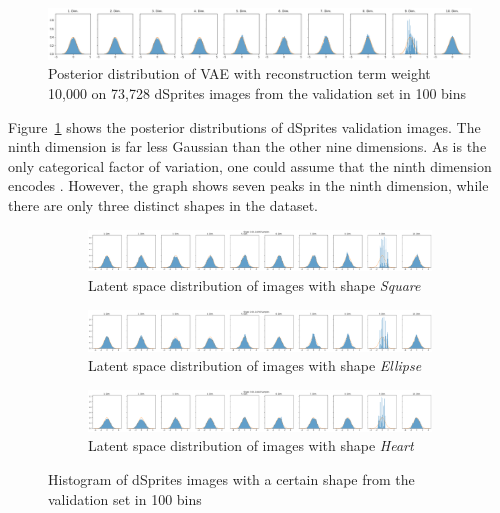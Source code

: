 \begin{figure}
    \centering
    \includegraphics[width=\textwidth]{images/latent_space_entanglement/vae_dsprites_lf_10000_dist.png}
    \caption[VAE Latent Space Distribution - dSprites]{Posterior distribution of \ac{VAE} with reconstruction term weight 10,000 on 73,728 dSprites images from the validation set in 100 bins}
    \label{fig:10000_vae_latent_space_distribution}
\end{figure}

Figure~\ref{fig:10000_vae_latent_space_distribution} shows the posterior distributions of dSprites validation images.
The ninth dimension is far less Gaussian than the other nine dimensions.
As  is the only categorical factor of variation, one could assume that the ninth dimension encodes .
However, the graph shows seven peaks in the ninth dimension, while there are only three distinct shapes in the dataset.

\begin{figure}
    \centering
    \begin{subfigure}{\textwidth}
        \centering
        \includegraphics[width=\textwidth]{images/latent_space_entanglement/vae_dsprites_lf_10000_dist_shape_1.png}
        \caption{Latent space distribution of images with shape \textit{Square}}
    \end{subfigure}
    \begin{subfigure}{\textwidth}
        \centering
        \includegraphics[width=\textwidth]{images/latent_space_entanglement/vae_dsprites_lf_10000_dist_shape_2.png}
        \caption{Latent space distribution of images with shape \textit{Ellipse}}
    \end{subfigure}
    \begin{subfigure}{\textwidth}
        \centering
        \includegraphics[width=\textwidth]{images/latent_space_entanglement/vae_dsprites_lf_10000_dist_shape_3.png}
        \caption{Latent space distribution of images with shape \textit{Heart}}
    \end{subfigure}
    \caption[VAE Latent Space Distribution - dSprites Shapes]{Histogram of dSprites images with a certain shape from the validation set in 100 bins}
    \label{fig:10000_vae_latent_space_distribution_shapes}
\end{figure}

